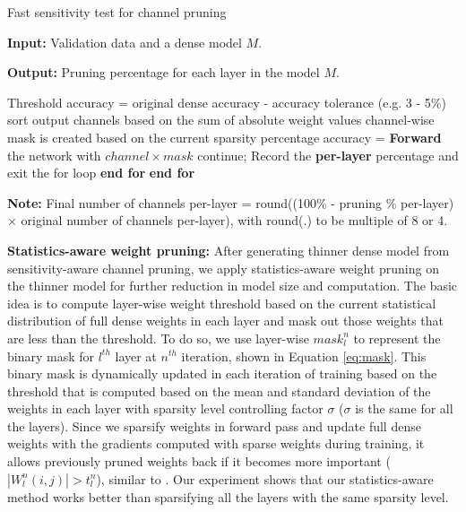 \documentclass{article}
\begin{document}
\vspace{-2mm}
\begin{algorithm}
\caption{Fast sensitivity test for channel pruning}
\scriptsize
\textbf{Input:} Validation data and a dense model $M$.

\textbf{Output:} Pruning percentage for each layer in the model $M$. %
\begin{algorithmic}[1]
\State Threshold accuracy = original dense accuracy - accuracy tolerance (e.g. 3 - 5\%)
\State sort output channels based on the sum of absolute weight values %
\State channel-wise mask is created based on the current sparsity percentage
\State accuracy = \textbf{Forward} the network with $channel \times mask$
\State continue;
\Else 
\State Record the \textbf{per-layer} percentage and exit the for loop
\EndIf
\EndFor
\State \textbf{end for}
\EndFor
\State \textbf{end for}
\end{algorithmic}
\textbf{Note:} Final number of channels per-layer = round((100\% - pruning \% per-layer) $\times$ original number of channels per-layer), with round(.) to be multiple of 8 or 4. 

\label{alg:sensitiveytest}
\end{algorithm}
\vspace{-2mm}


\textbf{Statistics-aware weight pruning:} %
After generating thinner dense model from sensitivity-aware channel pruning, we apply statistics-aware weight pruning on the thinner model for further reduction in model size and computation. The basic idea is to compute layer-wise weight threshold based on the current statistical distribution of full dense weights in each layer and mask out those weights that are less than the threshold. To do so, we use layer-wise $mask_{l}^{n}$ to represent the binary mask for $l^{th}$ layer at $n^{th}$ iteration, shown in Equation \ref{eq:mask}. This binary mask is dynamically updated in each iteration of training based on the threshold that is computed based on the mean and standard deviation of the weights in each layer with sparsity level controlling factor $\sigma$ ($\sigma$ is the same for all the layers). Since we sparsify weights in forward pass and update full dense weights with the gradients computed with sparse weights during training, it allows previously pruned weights back if it becomes more important ($ |W_{l}^{n}(i,j)| > t_{l}^{n}$), similar to \cite{guo2016dynamic}. Our experiment shows that our statistics-aware method works better than sparsifying all the layers with the same sparsity level.
\end{document}
